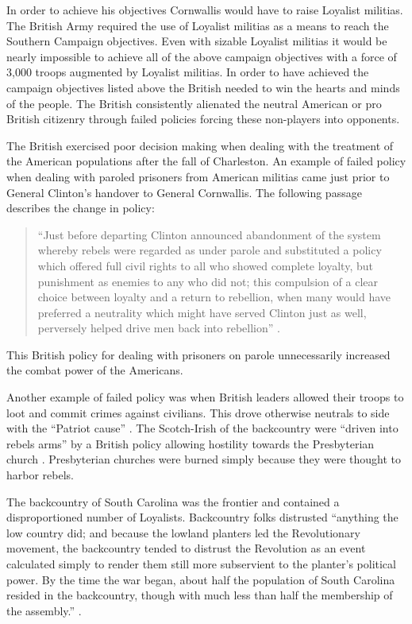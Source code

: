 In order to achieve his objectives Cornwallis would have to raise Loyalist
militias.  The British Army required the use of Loyalist militias as a means to
reach the Southern Campaign objectives.  Even with sizable Loyalist militias it
would be nearly impossible to achieve all of the above campaign objectives with
a force of 3,000 troops augmented by Loyalist militias.   In order to have
achieved the campaign objectives listed above the British needed to win the
hearts and minds of the people.  The British consistently alienated the neutral
American or pro British citizenry through failed policies forcing these
non-players into opponents.  

The British exercised poor decision making when dealing with the treatment of
the American populations after the fall of Charleston.  An example of failed
policy when dealing with paroled prisoners from American militias came just
prior to General Clinton’s handover to General Cornwallis.  The following
passage describes the change in policy: 

\begin{quote}
“Just before departing Clinton announced abandonment of the system whereby
rebels were regarded as under parole and substituted a policy which offered full
civil rights to all who showed complete loyalty, but punishment as enemies to
any who did not; this compulsion of a clear choice between loyalty and a return
to rebellion, when many would have preferred a neutrality which might have
served Clinton just as well, perversely helped drive men back into rebellion”
\cite[p.12]{weigley_partisan_1970}.
\end{quote} 

This British policy for dealing with prisoners on parole unnecessarily increased
the combat power of the Americans.

Another example of failed policy was when British leaders allowed their troops
to loot and commit crimes against civilians.  This drove otherwise neutrals to
side with the “Patriot cause” \cite[p.13]{weigley_partisan_1970}. The Scotch-Irish of the
backcountry were “driven into rebels arms” by a British policy allowing
hostility towards the Presbyterian church \cite[p.13]{weigley_partisan_1970}.  Presbyterian
churches were burned simply because they were thought to harbor rebels.  

The backcountry of South Carolina was the frontier and contained a
disproportioned number of Loyalists.  Backcountry folks distrusted “anything the
low country did; and because the lowland planters led the Revolutionary
movement, the backcountry tended to distrust the Revolution as an event
calculated simply to render them still more subservient to the planter’s
political power.  By the time the war began, about half the population of South
Carolina resided in the backcountry, though with much less than half the
membership of the assembly.'' \cite[p.11]{weigley_partisan_1970}.  

